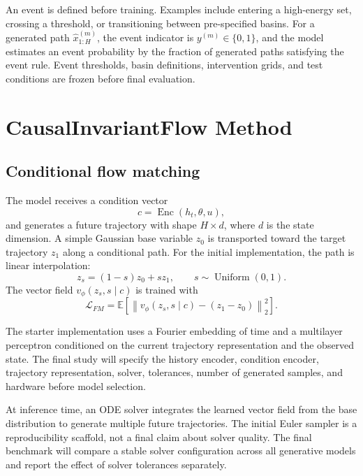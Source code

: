 \documentclass[11pt]{article}
\begin{document}
An event is defined before training. Examples include entering a high-energy set, crossing a threshold, or transitioning between pre-specified basins. For a generated path $\hat{x}_{1:H}^{(m)}$, the event indicator is $y^{(m)}\in\{0,1\}$, and the model estimates an event probability by the fraction of generated paths satisfying the event rule. Event thresholds, basin definitions, intervention grids, and test conditions are frozen before final evaluation.

\section{CausalInvariantFlow Method}

\subsection{Conditional flow matching}

The model receives a condition vector
\begin{equation}
    c=\operatorname{Enc}(h_t,\theta,u),
\end{equation}
and generates a future trajectory with shape $H\times d$, where $d$ is the state dimension. A simple Gaussian base variable $z_0$ is transported toward the target trajectory $z_1$ along a conditional path. For the initial implementation, the path is linear interpolation:
\begin{equation}
    z_s=(1-s)z_0+s z_1, \qquad s\sim\operatorname{Uniform}(0,1).
\end{equation}
The vector field $v_\phi(z_s,s\mid c)$ is trained with
\begin{equation}
    \mathcal{L}_{FM}=\mathbb{E}\left[\left\|v_\phi(z_s,s\mid c)-(z_1-z_0)\right\|_2^2\right].
\end{equation}

The starter implementation uses a Fourier embedding of time and a multilayer perceptron conditioned on the current trajectory representation and the observed state. The final study will specify the history encoder, condition encoder, trajectory representation, solver, tolerances, number of generated samples, and hardware before model selection.

At inference time, an ODE solver integrates the learned vector field from the base distribution to generate multiple future trajectories. The initial Euler sampler is a reproducibility scaffold, not a final claim about solver quality. The final benchmark will compare a stable solver configuration across all generative models and report the effect of solver tolerances separately.
\end{document}
